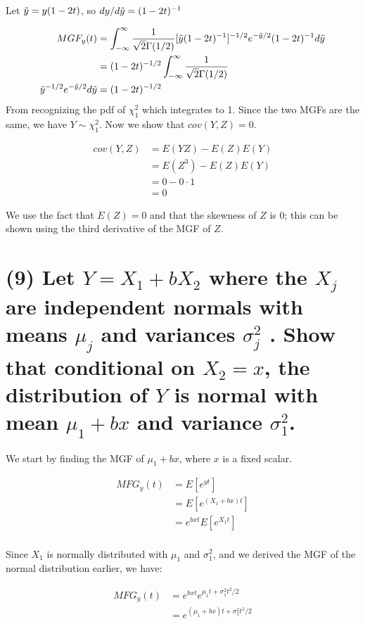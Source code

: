 \documentclass[11pt]{article}
\begin{document}
 Let $\Tilde{y} = y(1-2t)$, so $dy/d\Tilde{y} = (1-2t)^{-1}$
 
   \begin{align*}
     MGF_y(t) &=  \int_{-\infty}^{\infty} \frac{1}{\sqrt{2}\Gamma(1/2)} [\Tilde{y}(1-2t)^{-1}]^{-1/2}e^{-\Tilde{y}/2}(1-2t)^{-1}d\Tilde{y}\\
     &=  (1-2t)^{-1/2} \int_{-\infty}^{\infty} \frac{1}{\sqrt{2}\Gamma(1/2)}\\ \Tilde{y}^{-1/2}e^{-\Tilde{y}/2}d\Tilde{y}
      &=  (1-2t)^{-1/2}
 \end{align*}
From recognizing the pdf of  $\chi^2_1$ which integrates to 1. Since the two MGFs are the same, we have $Y \sim \chi^2_1$. Now we show that $cov(Y, Z)=0$.

\begin{align*}
    cov(Y, Z) &= E(YZ) - E(Z)E(Y)\\
    &= E(Z^3) - E(Z)E(Y)\\
    &= 0 - 0 \cdot 1\\
    &= 0
\end{align*}

We use the fact that $E(Z) = 0$ and that the skewness of $Z$ is 0; this can be shown using the third derivative of the MGF of $Z$.



\section*{(9) Let $Y = X_1 + bX_2$ where the $X_j$ are independent normals with means $\mu_j$ and variances $\sigma^2_j$ . Show that conditional on $X_2 = x$, the distribution of $Y$ is normal
with mean $\mu_1 + bx$ and variance $\sigma^2_1$.}

We start by finding the MGF of $\mu_1 + bx$, where $x$ is a fixed scalar. 

\begin{align*}
    MFG_y(t) &= E[e^{yt}] \\
    &=  E[e^{(X_1+bx)t}] \\ 
    & = e^{bxt}E[e^{X_1t}]\\
\end{align*}

Since $X_1$ is normally distributed with $\mu_1$ and $\sigma^2_1$, and we derived the MGF of the normal distribution earlier, we have: 

\begin{align*}
    MFG_y(t) &= e^{bxt}e^{\mu_1t + \sigma_1^2t^2/2}\\
    &= e^{(\mu_1 + bx)t + \sigma_1^2t^2/2}\\
\end{align*}
\end{document}
